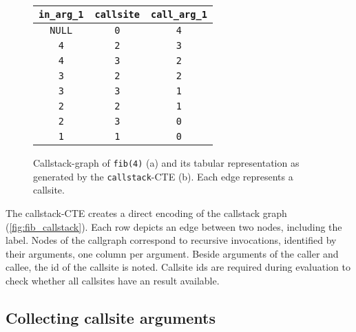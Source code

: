 \begin{figure}[h!]\small
    \begin{minipage}[b]{.5\linewidth}
    \centering
    
    \label{fig:fib_callstack_graph}
    \end{minipage}%
    \begin{minipage}[b]{.5\linewidth}
    \centering
     
    \begin{tabular}{c|c|c}
        \texttt{in\_arg\_1} & \texttt{callsite} & \texttt{call\_arg\_1} \\
        \hline
        \hline
        \texttt{NULL} & \texttt{0} & \texttt{4}\\
        \texttt{4} & \texttt{2} & \texttt{3}\\
        \texttt{4} & \texttt{3} & \texttt{2}\\
        \hline
        \hline
        \texttt{3} & \texttt{2} & \texttt{2}\\
        \texttt{3} & \texttt{3} & \texttt{1}\\
        \texttt{2} & \texttt{2} & \texttt{1}\\
        \texttt{2} & \texttt{3} & \texttt{0}\\
        \hline
        \texttt{1} & \texttt{1} & \texttt{0}\\
        \hline
    \end{tabular}
    \label{fig:fib_callstack_table}
    \end{minipage}
    \caption{Callstack-graph of \texttt{fib(4)} (a) and its tabular representation as generated by the \texttt{callstack}-CTE (b). Each edge represents a callsite.}\label{fig:fib_callstack}
\end{figure}

The callstack-CTE creates a direct encoding of the callstack graph (\autoref{fig:fib_callstack}). Each row depicts an edge between two nodes, including the label. Nodes of the callgraph correspond to recursive invocations, identified by their arguments, one column per argument. Beside arguments of the caller and callee, the id of the callsite is noted. Callsite ids are required during evaluation to check whether all callsites have an result available.

\subsection{Collecting callsite arguments}

